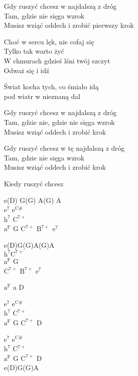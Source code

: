 \begin{textn}
    \chordfill
    Gdy ruszyć chcesz w najdalszą z dróg\\
    Tam, gdzie nie sięga wzrok\\
    Musisz wziąć oddech i zrobić pierwszy krok


    Choć w sercu lęk, nie cofaj się\\
    Tylko tak warto żyć\\
    W chmurach gdzieś lśni twój szczyt\\
    Odważ się i idź


    Świat kocha tych, co śmiało idą\\
    pod wiatr w nieznaną dal

    Gdy ruszyć chcesz w najdalszą z dróg\\
    Tam, gdzie nie, gdzie nie sięga wzrok\\
    Musisz wziąć oddech i zrobić krok

    Gdy ruszyć chcesz w tę najdalszą z dróg\\
    Tam, gdzie nie sięga wzrok\\
    Musisz wziąć oddech i zrobić krok

    Kiedy ruszyć chcesz
\end{textn}
\begin{chordw}
    e(D) G(G) A(G) A\\
    $\mathrm{e^{7}}$ $\mathrm{e^{C\#}}$\\
    $\mathrm{h^{7}}$ $\mathrm{C^{7+}}$\\
    $\mathrm{a^{F}}$ G $\mathrm{C^{7+}}$ $\mathrm{B^{7+}}$ $\mathrm{e^{7}}$

    \hfill\break
    \hfill\break
    e(D)G(G)A(G)A\\
    $\mathrm{h^{7}}$$\mathrm{C^{7+}}$\\
    $\mathrm{a^{F}}$ G\\
    $\mathrm{C^{7+}}$ $\mathrm{B^{7+}}$ $\mathrm{e^{7}}$

    \hfill\break
    \hfill\break
    $\mathrm{a^{F}}$ a D

    \hfill\break
    $\mathrm{e^{7}}$ $\mathrm{e^{C\#}}$\\
    $\mathrm{h^{7}}$ $\mathrm{C^{7+}}$\\
    $\mathrm{a^{F}}$ G $\mathrm{C^{7+}}$ D

    $\mathrm{e^{7}}$ $\mathrm{e^{C\#}}$\\
    $\mathrm{h^{7}}$ $\mathrm{C^{7+}}$\\
    $\mathrm{a^{F}}$ G $\mathrm{C^{7+}}$ D\\
    e(D)G(G)A
\end{chordw}
